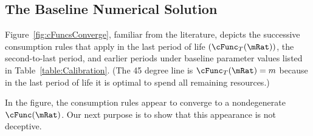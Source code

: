 \documentclass[BufferStockTheory]{subfiles}
\begin{document}
\begin{comment}
  In the case where the permanent shocks are lognormally distributed, we have
  \begin{align}
    \Ex[\pshk^{1-\CRRA}] & = &\exp((1-\CRRA)(-\sigma^{2}_{\pshk}/2)+(1-\CRRA)^{2}\sigma_{\pshk}^{2})
    \\  & = \exp((1-\CRRA)((-1/2)+(1-\CRRA))\sigma_{\pshk}^{2})
    \\  & = \exp((1-\CRRA)(1/2-\CRRA)\sigma_{\pshk}^{2})
  \end{align}
\end{comment}

\begin{comment}
  Equation
  \eqref{eq:GIC} can be raised to the $\CRRA$ power yielding the
  alternative form $(\Rfree \DiscFac) \PGroAdj^{-\CRRA} < 1$ which
  Deaton~\citeyearpar{deatonLiqConstr} imposed to guarantee that his
  problem defined a contraction mapping.
\end{comment}


\hypertarget{Baseline-Numerical-Solution}{}
\subsection{The Baseline Numerical Solution}

Figure~\ref{fig:cFuncsConverge}, familiar from the literature, depicts the successive consumption
rules that apply in the last period of life $(\cFunc_{T}(\mRat))$, the
second-to-last period, and earlier periods under baseline parameter values listed in Table~\ref{table:Calibration}.  (The 45 degree line is $\cFunc_{T}(\mRat) = m$ because in
the last period of life it is optimal to spend all remaining
resources.)

\hypertarget{Calibration}{}



\hypertarget{Symbols}{}



\providecommand{\figName}{Convergence-of-the-Consumption-Rules} %
\providecommand{\figFile}{cFuncsConverge} %
\hypertarget{\figFile}{}
\hypertarget{\figName}{}

In the figure, the consumption rules appear to converge to a nondegenerate $\cFunc(\mRat)$.  
Our next purpose is to show that this appearance is not deceptive.
\end{document}
